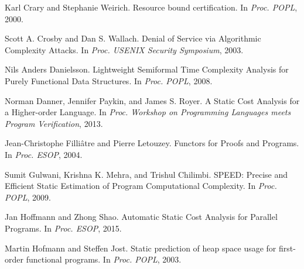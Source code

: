 \documentclass{llncs}
\newenvironment{SingleColumn}{\begin{list}{}{\topsep=0pt\partopsep=0pt%
\listparindent=0pt\itemindent=0pt\labelwidth=0pt\leftmargin=0pt\rightmargin=0pt%
\itemsep=0pt\parsep=0pt}\item}{\end{list}}
\newenvironment{AutoBibliography}{\begin{small}}{\end{small}}
\newcommand{\Autobibentry}[1]{\hspace{0.05\linewidth}\parbox[t]{0.95\linewidth}{\parindent=-0.05\linewidth#1\vspace{1.0ex}}}
\begin{document}
\begin{AutoBibliography}
\begin{SingleColumn}
\label{t:x28autobib_x22Karl_Crary_and_Stephanie_WeirichResource_bound_certificationIn_Procx2e_POPL2000x22x29}\Autobibentry{Karl Crary and Stephanie Weirich. Resource bound certification. In \textit{Proc. POPL}, 2000.}

\label{t:x28autobib_x22Scott_Ax2e_Crosby_and_Dan_Sx2e_WallachDenial_of_Service_via_Algorithmic_Complexity_AttacksIn_Procx2e_USENIX_Security_Symposium2003x22x29}\Autobibentry{Scott A. Crosby and Dan S. Wallach. Denial of Service via Algorithmic Complexity Attacks. In \textit{Proc. USENIX Security Symposium}, 2003.}

\label{t:x28autobib_x22Nils_Anders_DanielssonLightweight_Semiformal_Time_Complexity_Analysis_for_Purely_Functional_Data_StructuresIn_Procx2e_POPL2008x22x29}\Autobibentry{Nils Anders Danielsson. Lightweight Semiformal Time Complexity Analysis for Purely Functional Data Structures. In \textit{Proc. POPL}, 2008.}

\label{t:x28autobib_x22Norman_Dannerx2c_Jennifer_Paykinx2c_and_James_Sx2e_RoyerA_Static_Cost_Analysis_for_a_Higherx2dorder_LanguageIn_Procx2e_Workshop_on_Programming_Languages_meets_Program_Verification2013x22x29}\Autobibentry{Norman Danner, Jennifer Paykin, and James S. Royer. A Static Cost Analysis for a Higher{-}order Language. In \textit{Proc. Workshop on Programming Languages meets Program Verification}, 2013.}

\label{t:x28autobib_x22Jeanx2dChristophe_Fillixe2tre_and_Pierre_LetouzeyFunctors_for_Proofs_and_ProgramsIn_Procx2e_ESOP2004x22x29}\Autobibentry{Jean{-}Christophe Filli\^{a}tre and Pierre Letouzey. Functors for Proofs and Programs. In \textit{Proc. ESOP}, 2004.}

\label{t:x28autobib_x22Sumit_Gulwanix2c_Krishna_Kx2e_Mehrax2c_and_Trishul_ChilimbiSPEEDx3a_Precise_and_Efficient_Static_Estimation_of_Program_Computational_ComplexityIn_Procx2e_POPL2009x22x29}\Autobibentry{Sumit Gulwani, Krishna K. Mehra, and Trishul Chilimbi. SPEED: Precise and Efficient Static Estimation of Program Computational Complexity. In \textit{Proc. POPL}, 2009.}

\label{t:x28autobib_x22Jan_Hoffmann_and_Zhong_ShaoAutomatic_Static_Cost_Analysis_for_Parallel_ProgramsIn_Procx2e_ESOP2015x22x29}\Autobibentry{Jan Hoffmann and Zhong Shao. Automatic Static Cost Analysis for Parallel Programs. In \textit{Proc. ESOP}, 2015.}

\label{t:x28autobib_x22Martin_Hofmann_and_Steffen_JostStatic_prediction_of_heap_space_usage_for_firstx2dorder_functional_programsIn_Procx2e_POPL2003x22x29}\Autobibentry{Martin Hofmann and Steffen Jost. Static prediction of heap space usage for first{-}order functional programs. In \textit{Proc. POPL}, 2003.}


\end{SingleColumn}
\end{AutoBibliography}
\end{document}
